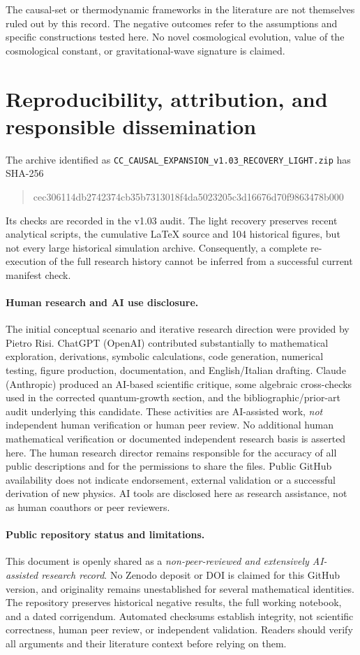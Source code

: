 \documentclass[11pt,a4paper]{article}
\begin{document}
The causal-set or thermodynamic frameworks in the literature are not themselves ruled out by this record. The negative outcomes refer to the assumptions and specific constructions tested here. No novel cosmological evolution, value of the cosmological constant, or gravitational-wave signature is claimed.

\section{Reproducibility, attribution, and responsible dissemination}
The archive identified as \texttt{CC\_CAUSAL\_EXPANSION\_v1.03\_RECOVERY\_LIGHT.zip} has SHA-256
\begin{quote}\ttfamily\footnotesize
cec306114db2742374cb35b7313018f4da5023205c3d16676d70f9863478b000
\end{quote}
Its checks are recorded in the v1.03 audit. The light recovery preserves recent analytical scripts, the cumulative \LaTeX{} source and 104 historical figures, but not every large historical simulation archive. Consequently, a complete re-execution of the full research history cannot be inferred from a successful current manifest check.

\paragraph{Human research and AI use disclosure.}
The initial conceptual scenario and iterative research direction were provided by Pietro Risi. ChatGPT (OpenAI) contributed substantially to mathematical exploration, derivations, symbolic calculations, code generation, numerical testing, figure production, documentation, and English/Italian drafting. Claude (Anthropic) produced an AI-based scientific critique, some algebraic cross-checks used in the corrected quantum-growth section, and the bibliographic/prior-art audit underlying this candidate. These activities are AI-assisted work, \emph{not} independent human verification or human peer review. No additional human mathematical verification or documented independent research basis is asserted here. The human research director remains responsible for the accuracy of all public descriptions and for the permissions to share the files. Public GitHub availability does not indicate endorsement, external validation or a successful derivation of new physics. AI tools are disclosed here as research assistance, not as human coauthors or peer reviewers.

\paragraph{Public repository status and limitations.}
This document is openly shared as a \emph{non-peer-reviewed and extensively AI-assisted research record}. No Zenodo deposit or DOI is claimed for this GitHub version, and originality remains unestablished for several mathematical identities. The repository preserves historical negative results, the full working notebook, and a dated corrigendum. Automated checksums establish integrity, not scientific correctness, human peer review, or independent validation. Readers should verify all arguments and their literature context before relying on them.
\end{document}

